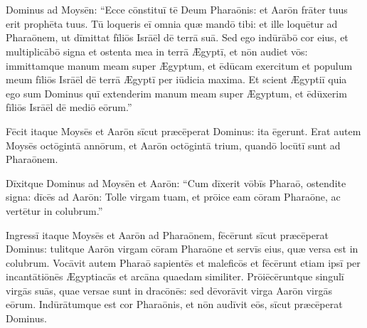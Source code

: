 \chapter{}


\thispagestyle{empty}

 Dominus ad Moysēn: ``Ecce cōnstituī tē Deum
Pharaōnis: et Aarōn frāter tuus erit
prophēta tuus. Tū loqueris eī omnia quæ
mandō tibi: et ille loquētur ad Pharaōnem,
ut dīmittat fīliōs Isrāēl dē terrā suā. Sed ego
indūrābō cor eius, et
multiplicābō signa et ostenta mea
in terrā Ægyptī, et nōn audiet vōs: immittamque manum meam super Ægyptum, et ēdūcam exercitum et
populum meum fīliōs Isrāēl dē terrā Ægyptī per
iūdicia maxima. Et scient Ægyptiī quia ego sum Dominus
quī extenderim manum meam super Ægyptum, et ēdūxerim fīliōs
Isrāēl dē mediō eōrum.''

Fēcit itaque
Moysēs et Aarōn sīcut præcēperat
Dominus: ita ēgerunt. Erat autem Moysēs octōgintā
annōrum, et Aarōn octōgintā trium, quandō locūtī sunt ad
Pharaōnem.

Dīxitque Dominus ad Moysēn et
Aarōn: ``Cum dīxerit vōbīs Pharaō, ostendite signa: dīcēs
ad Aarōn: Tolle virgam tuam, et prōice eam cōram
Pharaōne, ac vertētur in colubrum.''

Ingressī itaque Moysēs et Aarōn ad Pharaōnem, fēcērunt sīcut
præcēperat Dominus: tulitque Aarōn virgam cōram
Pharaōne et servīs eius, quæ versa est in
colubrum. Vocāvit autem Pharaō sapientēs
et maleficōs et fēcērunt etiam ipsī per
incantātiōnēs Ægyptiacās et
arcāna quaedam similiter. Prōiēcēruntque
singulī virgās suās, quae versae sunt in dracōnēs: sed
dēvorāvit virga Aarōn virgās eōrum.  Indūrātumque est cor Pharaōnis, et nōn audīvit eōs,
sīcut præcēperat Dominus.

